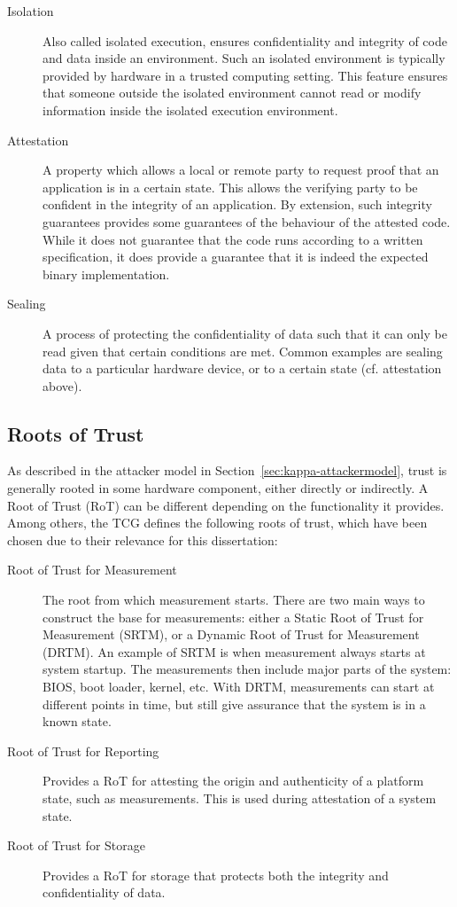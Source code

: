 \begin{description}
	\item[Isolation]
	Also called isolated execution, ensures confidentiality and integrity of code and data inside an environment.
	Such an isolated environment is typically provided by hardware in a trusted computing setting.
	This feature ensures that someone outside the isolated environment cannot read or modify information inside the isolated execution environment.
	\item[Attestation]
	A property which allows a local or remote party to request proof that an application is in a certain state.
	This allows the verifying party to be confident in the integrity of an application.
	By extension, such integrity guarantees provides some guarantees of the behaviour of the attested code.
	While it does not guarantee that the code runs according to a written specification, it does provide a guarantee that it is indeed the expected binary implementation.
	\item[Sealing]
	A process of protecting the confidentiality of data such that it can only be read given that certain conditions are met.
	Common examples are sealing data to a particular hardware device, or to a certain state (cf. attestation above).
\end{description}

\subsection{Roots of Trust}

As described in the attacker model in Section~\ref{sec:kappa-attackermodel}, trust is generally rooted in some hardware component, either directly or indirectly.
A Root of Trust (RoT) can be different depending on the functionality it provides.
Among others, the TCG defines the following roots of trust, which have been chosen due to their relevance for this dissertation:
\begin{description}
	\item[Root of Trust for Measurement] The root from which measurement starts.
		There are two main ways to construct the base for measurements: either a Static Root of Trust for Measurement (SRTM), or a Dynamic Root of Trust for Measurement (DRTM).
		An example of SRTM is when measurement always starts at system startup.
		The measurements then include major parts of the system: BIOS, boot loader, kernel, etc.
		With DRTM, measurements can start at different points in time, but still give assurance that the system is in a known state.
	\item[Root of Trust for Reporting] Provides a RoT for attesting the origin and authenticity of a platform state, such as measurements.
	This is used during attestation of a system state.
	\item[Root of Trust for Storage] Provides a RoT for storage that protects both the integrity and confidentiality of data.
\end{description}

